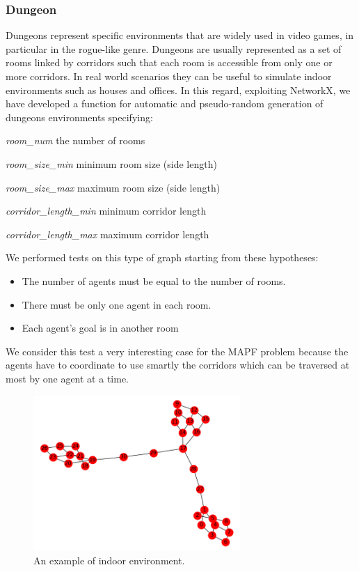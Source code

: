 \documentclass[12pt, a4paper, hidelinks]{article}
\numberwithin{equation}{section}
\begin{document}
\subsubsection{Dungeon}
Dungeons represent specific environments that are widely used in video games, in particular in the rogue-like genre.
Dungeons are usually represented as a set of rooms linked by corridors such that each room is accessible from only one or more corridors.
In real world scenarios they can be useful to simulate indoor environments such as houses and offices.
In this regard, exploiting NetworkX, we have developed a function for automatic and pseudo-random generation of dungeons environments specifying:
\begin{description}
    \item \textit{room\_num} the number of rooms
    \item \textit{room\_size\_min} minimum room size (side length)
    \item \textit{room\_size\_max} maximum room size (side length)
    \item \textit{corridor\_length\_min} minimum corridor length
    \item \textit{corridor\_length\_max} maximum corridor length
\end{description}
We performed tests on this type of graph starting from these hypotheses:
\begin{itemize} 
\item The number of agents must be equal to the number of rooms.
\item There must be only one agent in each room.
\item Each agent's goal is in another room
\end{itemize}
We consider this test a very interesting case for the MAPF problem because the agents have to coordinate to use smartly the corridors which can be traversed at most by one agent at a time.

\begin{figure}[h!]
\begin{center}
    \centering
    \includegraphics[width=0.7\textwidth]{dungeon.png}
    \caption{An example of indoor environment.}
\end{center}
\end{figure}
\end{document}
